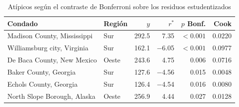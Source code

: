\begin{table}[htbp]
\centering
\footnotesize
\caption{Atípicos según el contraste de Bonferroni sobre los residuos estudentizados}\label{tab:bonferroni}
\begin{tabularx}{\linewidth}{>{\raggedright\arraybackslash}X l r r r r}
\toprule
Condado & Región & $y$ & $r^*$ & $p$ Bonf. & Cook \\
\midrule
Madison County, Mississippi & Sur & \num{292.5} & \num{7.35} & $<\num{0.001}$ & \num{0.0220} \\
Williamsburg city, Virginia & Sur & \num{162.1} & \num{-6.05} & $<\num{0.001}$ & \num{0.0977} \\
De Baca County, New Mexico & Oeste & \num{243.6} & \num{4.75} & \num{0.006} & \num{0.0716} \\
Baker County, Georgia & Sur & \num{127.6} & \num{-4.56} & \num{0.015} & \num{0.0048} \\
Echols County, Georgia & Sur & \num{126.4} & \num{-4.54} & \num{0.016} & \num{0.0080} \\
North Slope Borough, Alaska & Oeste & \num{256.9} & \num{4.44} & \num{0.027} & \num{0.0128} \\
\bottomrule
\end{tabularx}
\par{}
\end{table}
